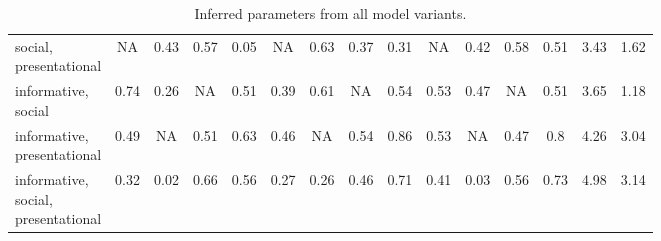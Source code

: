 \documentclass[12pt]{article}
\newcommand{\ejy}[1]{\textcolor{Red}{[ejy: #1]}}
\begin{document}
\begin{landscape}
\begin{table}[]
\begin{tabular}{lcccccccccccccc}
\makecell[l]{social, \\presentational}              & NA                        & 0.43       & 0.57               & 0.05          & NA                   & 0.63       & 0.37               & 0.31          & NA                 & 0.42       & 0.58               & 0.51          & 3.43               & 1.62 \\[0.5cm]
\makecell[l]{informative, \\social}                 & 0.74                      & 0.26       & NA                 & 0.51          & 0.39                 & 0.61       & NA                 & 0.54          & 0.53               & 0.47       & NA                 & 0.51          & 3.65               & 1.18 \\[0.5cm]
\makecell[l]{informative, \\presentational}         & 0.49                      & NA         & 0.51               & 0.63          & 0.46                 & NA         & 0.54               & 0.86          & 0.53               & NA         & 0.47               & 0.8           & 4.26               & 3.04 \\[0.5cm]
\makecell[l]{informative, \\social, \\presentational} & 0.32                      & 0.02       & 0.66               & 0.56          & 0.27                 & 0.26       & 0.46               & 0.71          & 0.41               & 0.03       & 0.56               & 0.73          & 4.98               & 3.14

\end{tabular}
\caption{Inferred parameters from all model variants.}
\end{table}
\end{landscape}


%
%
\end{document}
